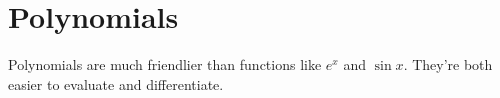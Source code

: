 \documentclass{scrreprt}
\begin{document}
\section*{Polynomials}

Polynomials are much friendlier than functions like $e^x$ and $\sin x$. They're both easier to evaluate and differentiate.
\end{document}
